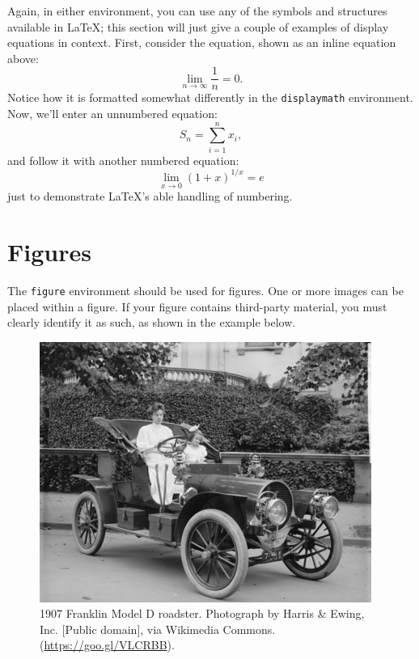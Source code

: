 \documentclass[%
twocolumn
]{ceurart}
\begin{document}
Again, in either environment, you can use any of the symbols and structures available in \LaTeX{}; this section will just give a couple of examples of display equations in context.
First, consider the equation, shown as an inline equation above:
\begin{equation}
  \lim_{n\rightarrow \infty} \frac{1}{n} = 0.
\end{equation}
Notice how it is formatted somewhat differently in the
\verb|displaymath|
environment.
Now, we'll enter an unnumbered equation:
\begin{displaymath}
  S_{n} = \sum_{i=1}^{n} x_{i} ,
\end{displaymath}
and follow it with another numbered equation:
\begin{equation}
  \lim_{x \to 0} (1 + x)^{1/x} = e
\end{equation}
just to demonstrate \LaTeX's able handling of numbering.

\section{Figures}

The
\verb|figure|
environment should be used for figures.
One or more images can be placed within a figure.
If your figure contains third-party material, you must clearly identify it as such, as shown in the example below.

\begin{figure}
  \centering
  \includegraphics[width=\linewidth]{sample-franklin}
  \caption{1907 Franklin Model D roadster. Photograph by Harris \&
    Ewing, Inc. [Public domain], via Wikimedia
    Commons. (\url{https://goo.gl/VLCRBB}).}
\end{figure}
\end{document}
